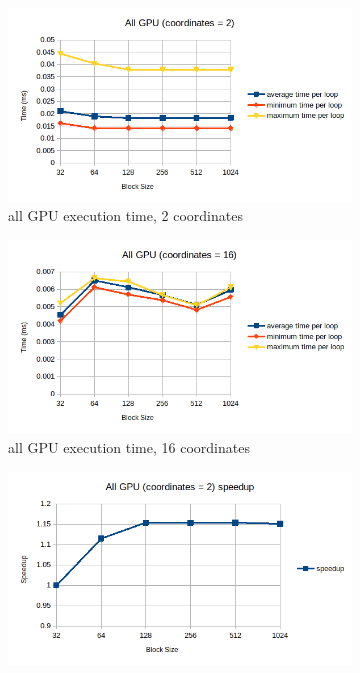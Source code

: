 \documentclass{article}
\newcommand{\eng}[1]{#1}
\begin{document}
\begin{figure}[h]
    \centering
    \begin{subfigure}{0.45\textwidth}
        \includegraphics[width=\textwidth]{a4/plots/all_gpu_2.png}
        \caption{\eng{all GPU} execution time, 2 coordinates}
        \label{fig:all-gpu-2}
    \end{subfigure}
    \begin{subfigure}{0.45\textwidth}
        \includegraphics[width=\textwidth]{a4/plots/all_gpu_16.png}
        \caption{\eng{all GPU} execution time, 16 coordinates}
        \label{fig:all-gpu-16}
    \end{subfigure}
    \vspace{1em}
    \begin{subfigure}{0.45\textwidth}
        \includegraphics[width=\textwidth]{a4/plots/all_gpu_2_speedup.png}

\end{subfigure}
\end{figure}
\end{document}
